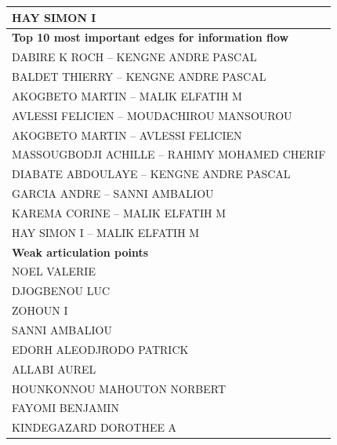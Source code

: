 \begin{table}[!ht]
\begin{tabular}{l}
\hspace{20pt}HAY SIMON I\\
\hline
\textbf{Top 10 most important edges for information flow}\\
\hspace{20pt}DABIRE K ROCH -- KENGNE ANDRE PASCAL\\
\hspace{20pt}BALDET THIERRY -- KENGNE ANDRE PASCAL\\
\hspace{20pt}AKOGBETO MARTIN -- MALIK ELFATIH M\\
\hspace{20pt}AVLESSI FELICIEN -- MOUDACHIROU MANSOUROU\\
\hspace{20pt}AKOGBETO MARTIN -- AVLESSI FELICIEN\\
\hspace{20pt}MASSOUGBODJI ACHILLE -- RAHIMY MOHAMED CHERIF\\
\hspace{20pt}DIABATE ABDOULAYE -- KENGNE ANDRE PASCAL\\
\hspace{20pt}GARCIA ANDRE -- SANNI AMBALIOU\\
\hspace{20pt}KAREMA CORINE -- MALIK ELFATIH M\\      
\hspace{20pt}HAY SIMON I -- MALIK ELFATIH M\\
\hline
\textbf{Weak articulation points}\\
\hspace{20pt}NOEL VALERIE\\
\hspace{20pt}DJOGBENOU LUC\\
\hspace{20pt}ZOHOUN I\\
\hspace{20pt}SANNI AMBALIOU\\
\hspace{20pt}EDORH ALEODJRODO PATRICK\\
\hspace{20pt}ALLABI AUREL\\
\hspace{20pt}HOUNKONNOU MAHOUTON NORBERT\\
\hspace{20pt}FAYOMI BENJAMIN\\
\hspace{20pt}KINDEGAZARD DOROTHEE A\\

\end{tabular}
\end{table}
